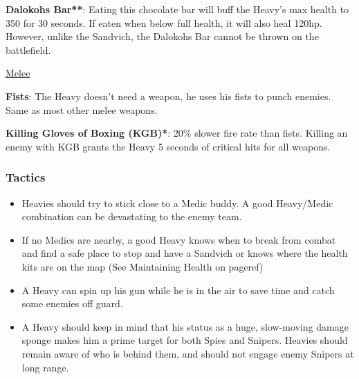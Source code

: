 {\bf Dalokohs Bar**}: Eating this chocolate bar will buff the Heavy's max health to 350 for 30 seconds. If eaten when below full health, it will also heal 120hp. However, unlike the Sandvich, the Dalokohs Bar cannot be thrown on the battlefield.

\newpage

\begin {center}
\underline {Melee}
\end {center}

{\bf Fists}: The Heavy doesn't need a weapon, he uses his fists to punch enemies. Same as most other melee weapons.

{\bf Killing Gloves of Boxing (KGB)*}: 20\% slower fire rate than fists.  Killing an enemy with KGB grants the Heavy 5 seconds of critical hits for all weapons.


\subsubsection {Tactics}
\begin {itemize}

\item Heavies should try to stick close to a Medic buddy. A good Heavy/Medic combination can be devastating to the enemy team. 

\item If no Medics are nearby, a good Heavy knows when to break from combat and find a safe place to stop and have a Sandvich or knows where the health kits are on the map (See Maintaining Health on {{pageref}})

\item A Heavy can spin up his gun while he is in the air to save time and catch some enemies off guard.

\item A Heavy should keep in mind that his status as a huge, slow-moving damage sponge makes him a prime target for both Spies and Snipers. Heavies should remain aware of who is behind them, and should not engage enemy Snipers at long range.

\end {itemize}